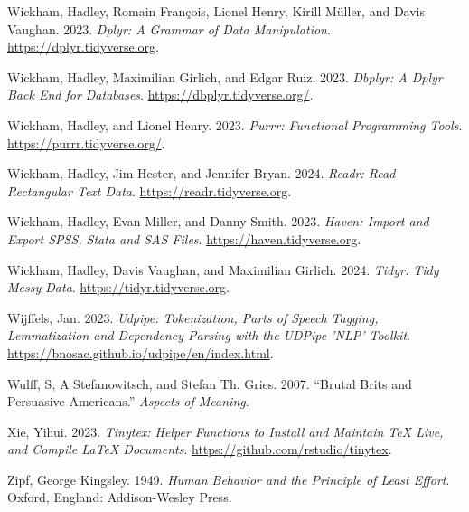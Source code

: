 \documentclass[
  letterpaper,
]{latex/krantz}
\newlength{\cslhangindent}
\newenvironment{CSLReferences}[2] %
 {\begin{list}{}{%
  \setlength{\itemindent}{0pt}
  \setlength{\leftmargin}{0pt}
  \setlength{\parsep}{0pt}
  \ifodd #1
   \setlength{\leftmargin}{\cslhangindent}
   \setlength{\itemindent}{-1\cslhangindent}
  \fi
  \setlength{\itemsep}{#2\baselineskip}}}
 {\end{list}}
\theoremstyle{definition}
\theoremstyle{remark}
\begin{document}
\begin{CSLReferences}{1}{0}
Wickham, Hadley, Romain François, Lionel Henry, Kirill Müller, and Davis
Vaughan. 2023. \emph{Dplyr: A Grammar of Data Manipulation}.
\url{https://dplyr.tidyverse.org}.

Wickham, Hadley, Maximilian Girlich, and Edgar Ruiz. 2023. \emph{Dbplyr:
A Dplyr Back End for Databases}. \url{https://dbplyr.tidyverse.org/}.

Wickham, Hadley, and Lionel Henry. 2023. \emph{Purrr: Functional
Programming Tools}. \url{https://purrr.tidyverse.org/}.

Wickham, Hadley, Jim Hester, and Jennifer Bryan. 2024. \emph{Readr: Read
Rectangular Text Data}. \url{https://readr.tidyverse.org}.

Wickham, Hadley, Evan Miller, and Danny Smith. 2023. \emph{Haven: Import
and Export SPSS, Stata and SAS Files}.
\url{https://haven.tidyverse.org}.

Wickham, Hadley, Davis Vaughan, and Maximilian Girlich. 2024.
\emph{Tidyr: Tidy Messy Data}. \url{https://tidyr.tidyverse.org}.

Wijffels, Jan. 2023. \emph{Udpipe: Tokenization, Parts of Speech
Tagging, Lemmatization and Dependency Parsing with the UDPipe 'NLP'
Toolkit}. \url{https://bnosac.github.io/udpipe/en/index.html}.

Wulff, S, A Stefanowitsch, and Stefan Th. Gries. 2007. {``Brutal Brits
and Persuasive Americans.''} \emph{Aspects of Meaning}.

Xie, Yihui. 2023. \emph{Tinytex: Helper Functions to Install and
Maintain TeX Live, and Compile LaTeX Documents}.
\url{https://github.com/rstudio/tinytex}.

Zipf, George Kingsley. 1949. \emph{Human Behavior and the Principle of
Least Effort}. Oxford, England: Addison-Wesley Press.

\end{CSLReferences}



\printindex
\end{document}
